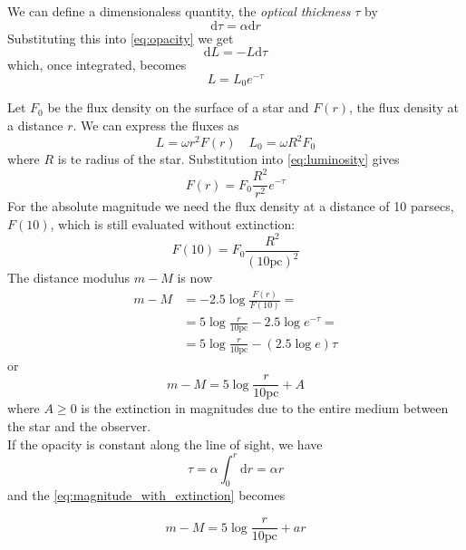 \documentclass[a4paper,11pt,twoside]{book}
\newcommand{\de}[0]{\textrm{d}}
\begin{document}
We can define a dimensionaless quantity, the \textit{optical thickness} $\tau$ by 
\begin{equation}
	\de \tau = \alpha \de r
\end{equation}
Substituting this into \eqref{eq:opacity} we get
\begin{equation}
	\de L = - L \de \tau
\end{equation}
which, once integrated, becomes 
\begin{equation}
	L=L_0e^{-\tau}
	\label{eq:luminosity}
\end{equation}

Let $F_0$ be the flux density on the surface of a star and $F(r)$, the flux density at a distance $r$. We can express the fluxes as
\begin{equation}
	L=\omega r^2 F(r) \quad L_0=\omega R^2 F_0
\end{equation}
where $R$ is te radius of the star. Substitution into \eqref{eq:luminosity} gives
\begin{equation}
	F(r)=F_0\frac{R^2}{r^2}e^{-\tau}
\end{equation}
For the absolute magnitude we need the flux density at a distance of 10 parsecs, $F(10)$, which is still evaluated without extinction:
\begin{equation}
	F(10)=F_0\frac{R^2}{(10 \textrm{pc})^2}
\end{equation}
The distance modulus $m-M$ is now
\begin{align}
	m-M &= -2.5 \log{\frac{F(r)}{F(10)}} =\\
	& = 5 \log \frac{r}{10 \textrm{pc}} - 2.5 \log e^{-\tau} = \\
	& = 5 \log \frac{r}{10 \textrm{pc}} - (2.5 \log e)\tau
\end{align}
or
\begin{equation}
	m - M = 5\log \frac{r}{10 \textrm{pc}} + A
	\label{eq:magnitude_with_extinction}
\end{equation}
where $A\geq0$ is the extinction in magnitudes due to the entire medium between the star and the observer.\\

If the opacity is constant along the line of
sight, we have
\begin{equation}
	\tau = \alpha \int_0^r\de r = \alpha r 
\end{equation}
and the \eqref{eq:magnitude_with_extinction} becomes 

\begin{equation}
	m-M = 5\log \frac{r}{10 \textrm{pc}}+ar
\end{equation}
\end{document}
